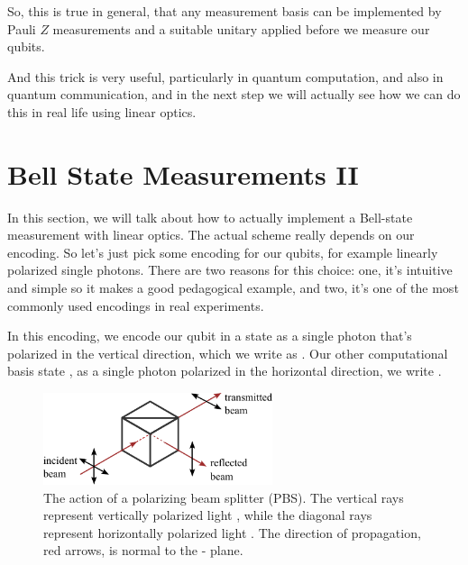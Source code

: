 So, this is true in general, that any measurement basis can be implemented by Pauli $Z$ measurements and a suitable unitary applied before we measure our qubits.

And this trick is very useful, particularly in quantum computation, and also in quantum communication, and in the next step we will actually see how we can do this in real life using linear optics.



\section{Bell State Measurements II}
\label{sec:13-3_Bell_state_measurement_2}

In this section, we will talk about how to actually implement a Bell-state measurement with linear optics. The actual scheme really depends on our encoding. So let's just pick some encoding for our qubits, for example linearly polarized single photons. There are two reasons for this choice: one, it's intuitive and simple so it makes a good pedagogical example, and two, it's one of the most commonly used encodings in real experiments.

In this encoding, we encode our qubit in a state  as a single photon that's polarized in the vertical direction, which we write as . Our other computational basis state , as a single photon polarized in the horizontal direction, we write .

\begin{figure}[t]
    \centering
    \includegraphics[width=0.6\textwidth]{lesson13/13-2_PBS.pdf}
    \caption[A polarizing beam splitter (PBS)]{The action of a polarizing beam splitter (PBS).  The vertical rays represent vertically polarized light , while the diagonal rays represent horizontally polarized light .  The direction of propagation, red arrows, is normal to the - plane.}
    \label{fig:13-PBS}
\end{figure}



